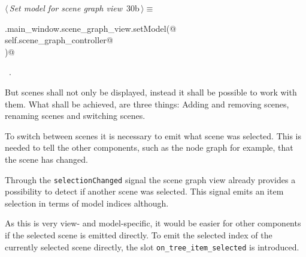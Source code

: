 \documentclass[
    a4paper,      %
    10pt,         %
    openright,    %
    notitlepage,  %
    parskip=half, %
]{scrreprt}       %
\theoremstyle{definition}                    %
\begin{document}
\begin{flushleft} \small
\begin{minipage}{\linewidth}\label{scrap33}\raggedright\small
{} $\langle\,${\itshape Set model for scene graph view}\nobreak\ {\footnotesize {30b}}$\,\rangle\equiv$
\vspace{-1ex}
\begin{list}{}{} \item
\mbox{}\lstinline@self.main_window.scene_graph_view.setModel(@\\
\mbox{}\lstinline@    self.scene_graph_controller@\\
\mbox{}\lstinline@)@{\NWsep}
\end{list}
\vspace{-1.5ex}
\footnotesize
\begin{list}{}{\setlength{\itemsep}{-\parsep}\setlength{\itemindent}{-\leftmargin}}
\item \NWtxtMacroRefIn\ .

\item{}
\end{list}
\end{minipage}\vspace{4ex}
\end{flushleft}
But scenes shall not only be displayed, instead it shall be possible to work
with them. What shall be achieved, are three things: Adding and removing scenes,
renaming scenes and switching scenes.

To switch between scenes it is necessary to emit what scene was selected. This
is needed to tell the other components, such as the node graph for example, that
the scene has changed.

Through the \verb+selectionChanged+ signal the scene graph view already provides
a possibility to detect if another scene was selected. This signal emits an item
selection in terms of model indices although.

As this is very view- and model-specific, it would be easier for other
components if the selected scene is emitted directly. To emit the selected
index of the currently selected scene directly, the slot
\verb+on_tree_item_selected+ is introduced.
\end{document}
